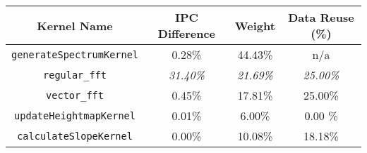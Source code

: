   \begin{tabular}{|c|c|c|c|}
    \hline
    \textbf{Kernel Name} & \textbf{IPC Difference} & \textbf{Weight} & \textbf{Data Reuse (\%)} \\
    \hline
    \hline 
    \verb|generateSpectrumKernel| & 0.28\% & 44.43\% & n/a \\
    \verb|regular_fft| & \textit{31.40\%} & \textit{21.69\%} & \textit{25.00\%} \\
    \verb|vector_fft| & 0.45\% & 17.81\% & 25.00\% \\
    \verb|updateHeightmapKernel| & 0.01\% & 6.00\% & 0.00 \% \\ 
    \verb|calculateSlopeKernel| & 0.00\% & 10.08\% & 18.18\% \\
    \hline 
  \end{tabular}
